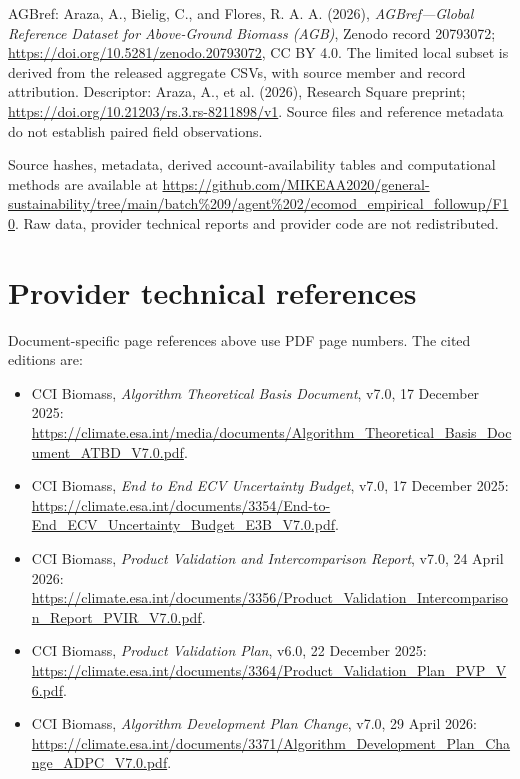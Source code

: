 \documentclass[11pt,a4paper]{article}
\begin{document}
AGBref: Araza, A., Bielig, C., and Flores, R. A. A. (2026), \emph{AGBref---Global Reference Dataset for Above-Ground Biomass (AGB)}, Zenodo record 20793072; \url{https://doi.org/10.5281/zenodo.20793072}, CC BY 4.0. The limited local subset is derived from the released aggregate CSVs, with source member and record attribution. Descriptor: Araza, A., et al. (2026), Research Square preprint; \url{https://doi.org/10.21203/rs.3.rs-8211898/v1}. Source files and reference metadata do not establish paired field observations.

Source hashes, metadata, derived account-availability tables and computational methods are available at \url{https://github.com/MIKEAA2020/general-sustainability/tree/main/batch%209/agent%202/ecomod_empirical_followup/F10}. Raw data, provider technical reports and provider code are not redistributed.


\section{Provider technical references}
Document-specific page references above use PDF page numbers. The cited editions are:
\begin{itemize}
\item CCI Biomass, \emph{Algorithm Theoretical Basis Document}, v7.0, 17 December 2025: \url{https://climate.esa.int/media/documents/Algorithm_Theoretical_Basis_Document_ATBD_V7.0.pdf}.
\item CCI Biomass, \emph{End to End ECV Uncertainty Budget}, v7.0, 17 December 2025: \url{https://climate.esa.int/documents/3354/End-to-End_ECV_Uncertainty_Budget_E3B_V7.0.pdf}.
\item CCI Biomass, \emph{Product Validation and Intercomparison Report}, v7.0, 24 April 2026: \url{https://climate.esa.int/documents/3356/Product_Validation_Intercomparison_Report_PVIR_V7.0.pdf}.
\item CCI Biomass, \emph{Product Validation Plan}, v6.0, 22 December 2025: \url{https://climate.esa.int/documents/3364/Product_Validation_Plan_PVP_V6.pdf}.
\item CCI Biomass, \emph{Algorithm Development Plan Change}, v7.0, 29 April 2026: \url{https://climate.esa.int/documents/3371/Algorithm_Development_Plan_Change_ADPC_V7.0.pdf}.
\end{itemize}
\end{document}
